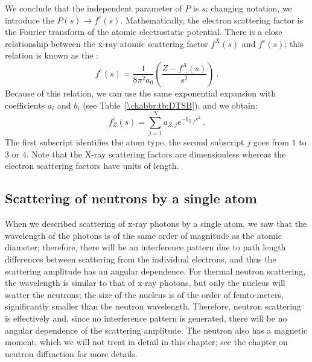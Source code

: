 We conclude that the independent parameter of $P$ is $s$; changing notation, we introduce the  $P(s)\rightarrow f^e(s)$.  Mathematically, the electron scattering factor is the Fourier transform of the atomic electrostatic potential. There is a close relationship between the x-ray atomic scattering factor $f^X(s)$ and $f^e(s)$; this relation is known as the : 
\begin{equation}
	f^e(s) = \frac{1}{8\pi^2a_0}\left(\frac{Z-f^X(s)}{s^2}\right)\ .\label{\chabbr:eq:MottBethe}
\end{equation}
Because of this relation, we can use the same exponential expansion with coefficients $a_i$ and $b_i$ (see Table~\ref{\chabbr:tb:DTSB}), and we obtain:
\begin{equation}
	f^e_Z(s) = \sum_{j=1}^N a_{Z,j}\mathrm{e}^{-b_{Z,j}s^2}\ .
\end{equation}
The first subscript identifies the atom type, the second subscript $j$ goes from $1$ to $3$ or $4$.  Note that the X-ray scattering factors are dimensionless whereas the electron scattering factors have units of length.


\subsection{Scattering of neutrons by a single atom}\label{\chabbr:ssec:singleneutron}

When we described scattering of x-ray photons by a single atom, we saw that the wavelength of the photons is of the same order of magnitude as the atomic diameter; therefore, there will be an interference pattern due to path length differences between scattering from the individual electrons, and thus the scattering amplitude has an angular dependence.  For thermal neutron scattering, the wavelength is similar to that of x-ray photons, but only the nucleus will scatter the neutrons; the size of the nucleus is of the order of femto-meters, significantly smaller than the neutron wavelength. Therefore, neutron scattering is effectively  and, since no interference pattern is generated, there will be no angular dependence of the scattering amplitude.  The neutron also has a magnetic moment, which we will not treat in detail in this chapter; see the chapter on neutron diffraction for more details.


